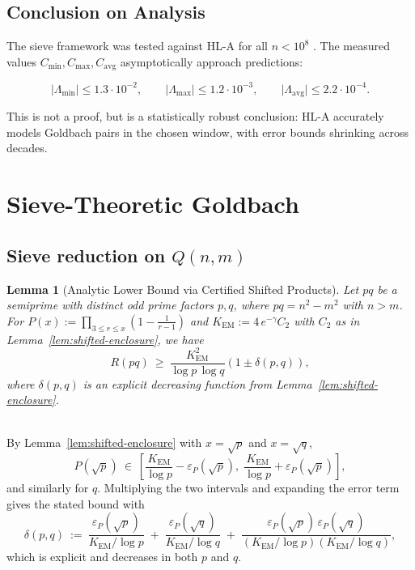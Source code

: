 \documentclass[11pt]{article}
\makeatletter
\theoremstyle{inline}
\theoremstyle{break}
\newtheorem{lemma}{Lemma}
\renewenvironment{proof}[1][\proofname]{%
  \par\pushQED{\qed}%
  \normalfont \topsep6\p@\@plus6\p@\relax
  \trivlist
  \item[\hskip\labelsep
        \itshape
    #1\@addpunct{.}]\mbox{}\\  %
}{%
  \popQED\endtrivlist\@endpefalse
}
\theoremstyle{break}
\theoremstyle{break}
\theoremstyle{break}
\theoremstyle{break}
\theoremstyle{break}
\theoremstyle{break}
\theoremstyle{inline}
\newcommand{\xSecondLambdaMinLimit}{1.3\cdot 10^{-2}} %
\newcommand{\xSecondLambdaMaxLimit}{1.2\cdot 10^{-3}} %
\newcommand{\xSecondLambdaAvgLimit}{2.2\cdot 10^{-4}} %
\newcommand{\tavg}{{\scriptscriptstyle\mathrm{avg}}}
\newcommand{\Cmeas}{C}              %
\newcommand{\Kem}{K_{\mathrm{EM}}}              %
\makeatother
\begin{document}

\subsection{Conclusion on Analysis}

The sieve framework was tested against HL-A for all \( n<10^8 \) . The measured values \( \Cmeas_{\min},\Cmeas_{\max},\Cmeas_{\tavg} \) asymptotically approach predictions:

\begin{equation}
\lvert \Lambda_{\min} \rvert \le \xSecondLambdaMinLimit,\qquad
\lvert \Lambda_{\max} \rvert \le \xSecondLambdaMaxLimit,\qquad
\lvert \Lambda_{\tavg} \rvert \le \xSecondLambdaAvgLimit.
\end{equation}

This is not a proof, but is a statistically robust conclusion: HL-A accurately models Goldbach pairs in the chosen window, with error bounds shrinking across decades.

\section{Sieve-Theoretic Goldbach}\label{sec:sgb}

\subsection{Sieve reduction on \( Q(n,m) \)}\label{sec:reduction}
\begin{lemma}[Analytic Lower Bound via Certified Shifted Products]
\label{lem:analytic-lower-bound-reduction}
Let \( pq \) be a semiprime with distinct odd prime factors \( p,q \), where \( pq=n^2-m^2 \) with \( n>m \). 
For \( P(x):=\prod_{3\le r\le x}(1-\tfrac{1}{r-1}) \) and \( \Kem:=4\,e^{-\gamma}C_2 \) with \( C_2 \) as in Lemma~\ref{lem:shifted-enclosure}, we have
\begin{equation}
R(pq)\ \ge\ \frac{\Kem^2}{\log p\,\log q}
\left(1 \pm \delta(p,q)\right),
\end{equation}
where \( \delta(p,q) \) is an explicit decreasing function from Lemma~\ref{lem:shifted-enclosure}.
\end{lemma}

\begin{proof}
By Lemma~\ref{lem:shifted-enclosure} with \( x=\sqrt{p} \) and \( x=\sqrt{q} \),
\begin{equation}
P(\sqrt{p})\ \in\ \left[\frac{\Kem}{\log p} - \varepsilon_P(\sqrt{p}),\; \frac{\Kem}{\log p} + \varepsilon_P(\sqrt{p})\right],
\end{equation}
and similarly for \( q \). Multiplying the two intervals and expanding the error term gives the stated bound with
\begin{equation}
\delta(p,q)\ :=\ \frac{\varepsilon_P(\sqrt{p})}{\Kem/\log p} \;+\; \frac{\varepsilon_P(\sqrt{q})}{\Kem/\log q} \;+\; \frac{\varepsilon_P(\sqrt{p})\,\varepsilon_P(\sqrt{q})}{(\Kem/\log p)(\Kem/\log q)},
\end{equation}
which is explicit and decreases in both \( p \) and \( q \).
\end{proof}
\end{document}

